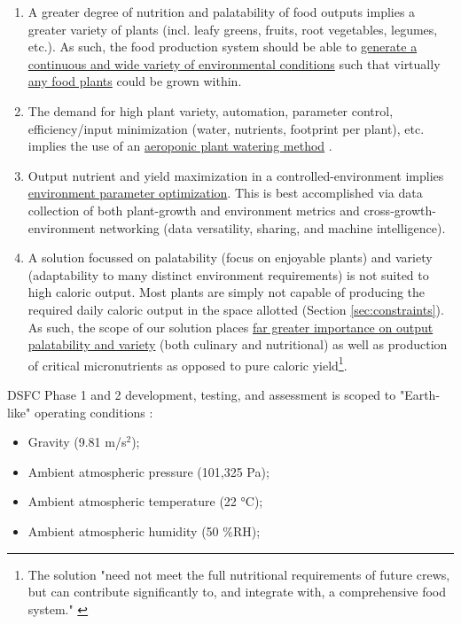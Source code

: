 \documentclass{../tex/report}
\begin{document}
\begin{enumerate}[label=SC\arabic*., ref=SC\arabic*]
\clearpage
    \item \label{sc:5} A greater degree of nutrition and palatability of food outputs implies a greater variety of plants (incl. leafy greens, fruits, root vegetables, legumes, etc.). As such, the food production system should be able to \uline{generate a continuous and wide variety of environmental conditions} such that virtually \uline{any food plants} could be grown within.
    \item \label{sc:6} The demand for high plant variety, automation, parameter control, efficiency/input minimization (water, nutrients, footprint per plant), etc. implies the use of an \uline{aeroponic plant watering method} \cite{spinoff}.
    \item \label{sc:7} Output nutrient and yield maximization in a controlled-environment implies \uline{environment parameter optimization}. This is best accomplished via data collection of both plant-growth and environment metrics and cross-growth-environment networking (data versatility, sharing, and machine intelligence).
    \item \label{sc:8} A solution focussed on palatability (focus on enjoyable plants) and variety (adaptability to many distinct environment requirements) is not suited to high caloric output. Most plants are simply not capable of producing the required daily caloric output in the space allotted (Section \ref{sec:constraints}). As such, the scope of our solution places \uline{far greater importance on output palatability and variety} (both culinary and nutritional) as well as production of critical micronutrients as opposed to pure caloric yield\footnote{The solution "need not meet the full nutritional requirements of future crews, but can contribute significantly to, and integrate with, a comprehensive food system." \cite{applicantguide}}.
\end{enumerate}

DSFC Phase 1 and 2 development, testing, and assessment is scoped to "Earth-like" operating conditions \cite{applicantguide,dsfc-phase2}:
\begin{itemize}
    \item Gravity (9.81 m/s${}^2$);
    \item Ambient atmospheric pressure (101,325 Pa);
    \item Ambient atmospheric temperature (22 °C);
    \item Ambient atmospheric humidity (50 \%RH);
\end{itemize}
\end{document}
